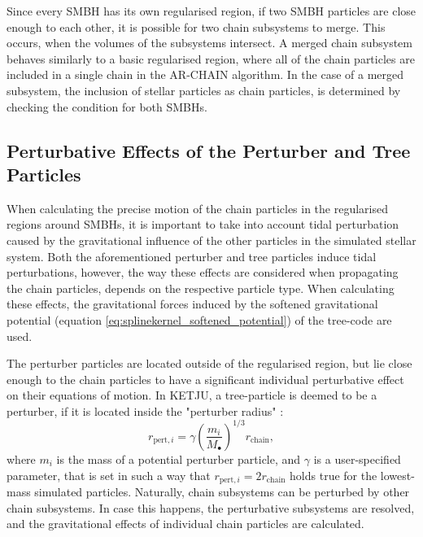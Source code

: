 \documentclass[english, twoside]{HYgradu}
\begin{document}
Since every SMBH has its own regularised region, if two SMBH particles are close enough to each other, it is possible for two chain subsystems to merge. This occurs, when the volumes of the subsystems intersect. A merged chain subsystem behaves similarly to a basic regularised region, where all of the chain particles are included in a single chain in the AR-CHAIN algorithm. In the case of a merged subsystem, the inclusion of stellar particles as chain particles, is determined by checking the condition for both SMBHs.

\subsection{Perturbative Effects of the Perturber and Tree Particles}

When calculating the precise motion of the chain particles in the regularised regions around SMBHs, it is important to take into account tidal perturbation caused by the gravitational influence of the other particles in the simulated stellar system. Both the aforementioned perturber and tree particles induce tidal perturbations, however, the way these effects are considered when propagating the chain particles, depends on the respective particle type. When calculating these effects, the gravitational forces induced by the softened gravitational potential (equation \ref{eq:splinekernel_softened_potential}) of the tree-code are used.

The perturber particles are located outside of the regularised region, but lie close enough to the chain particles to have a significant individual perturbative effect on their equations of motion. In KETJU, a tree-particle is deemed to be a perturber, if it is located inside the "perturber radius" \citep{Rantala2017KETJU}:
\begin{equation}
r_{\mathrm{pert},i} = \gamma \left( \frac{m_i}{M_\bullet} \right)^{1/3} r_\mathrm{chain},
\end{equation}
where $m_i$ is the mass of a potential perturber particle, and $\gamma$ is a user-specified parameter, that is set in such a way that $r_{\mathrm{pert},i} = 2r_\mathrm{chain}$ holds true for the lowest-mass simulated particles. Naturally, chain subsystems can be perturbed by other chain subsystems. In case this happens, the perturbative subsystems are resolved, and the gravitational effects of individual chain particles are calculated.
\end{document}
